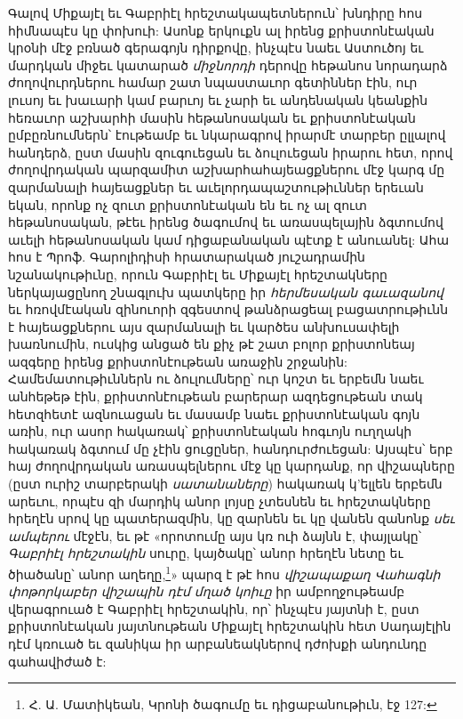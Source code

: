 \documentclass{article}
\begin{document}
{Գալով Միքայէլ եւ Գաբրիէլ հրեշտակապետներուն՝ խնդիրը հոս հիմնապէս կը փոխուի: Ասոնք երկուքն ալ իրենց քրիստոնէական կրօնի մէջ բռնած գերագոյն դիրքովը, ինչպէս նաեւ Աստուծոյ եւ մարդկան միջեւ կատարած \emph{միջնորդի} դերովը հեթանոս նորադարձ ժողովուրդներու համար շատ նպաստաւոր գետիններ էին, ուր լուսոյ եւ խաւարի կամ բարւոյ եւ չարի եւ անդենական կեանքին հեռաւոր աշխարհի մասին հեթանոսական եւ քրիստոնէական ըմբըռնումներն՝ էութեամբ եւ նկարագրով իրարմէ տարբեր ըլլալով հանդերձ, ըստ մասին զուգուեցան եւ ձուլուեցան իրարու հետ, որով ժողովրդական պարզամիտ աշխարհահայեացքներու մէջ կարգ մը զարմանալի հայեացքներ եւ աւելորդապաշտութիւններ երեւան եկան, որոնք ոչ զուտ քրիստոնէական են եւ ոչ ալ զուտ հեթանոսական, թէեւ իրենց ծագումով եւ առասպելային ձգտումով աւելի հեթանոսական կամ դիցաբանական պէտք է անուանել: Ահա հոս է Պրոֆ. Գարոլիդիսի հրատարակած յուշադրամին նշանակութիւնը, որուն Գաբրիէլ եւ Միքայէլ հրեշտակները ներկայացընող շնագլուխ պատկերը իր \emph{հերմեսական գաւազանով} եւ հռովմէական զինուորի զգեստով թանձրացեալ բացատրութիւնն է հայեացքներու այս զարմանալի եւ կարծես անխուսափելի խառնումին, ուսկից անցած են քիչ թէ շատ բոլոր քրիստոնեայ ազգերը իրենց քրիստոնէութեան առաջին շրջանին: Համեմատութիւններն ու ձուլումները՝ ուր կոշտ եւ երբեմն նաեւ անհեթեթ էին, քրիստոնէութեան բարերար ազդեցութեան տակ հետզհետէ ազնուացան եւ մասամբ նաեւ քրիստոնէական գոյն առին, ուր ասոր հակառակ՝ քրիստոնէական հոգւոյն ուղղակի հակառակ ձգտում մը չէին ցուցըներ, հանդուրժուեցան: Այսպէս՝ երբ հայ ժողովրդական առասպելներու մէջ կը կարդանք, որ վիշապները (ըստ ուրիշ տարբերակի \emph{սատանաները}) հակառակ կ'ելլեն երբեմն արեւու, որպէս զի մարդիկ անոր լոյսը չտեսնեն եւ հրեշտակները հրեղէն սրով կը պատերազմին, կը զարնեն եւ կը վանեն զանոնք \emph{սեւ ամպերու} մէջէն, եւ թէ «որոտումը այս կռ ուի ձայնն է, փայլակը՝ \emph{Գաբրիէլ հրեշտակին} սուրը, կայծակը՝ անոր հրեղէն նետը եւ ծիածանը՝ անոր աղեղը,\footnote{Հ. Ա. Մատիկեան, Կրոնի ծագումը եւ դիցաբանութիւն, էջ 127:}» պարզ է թէ հոս \emph{վիշապաքաղ Վահագնի փոթորկաբեր վիշապին դէմ մղած կոիւը} իր ամբողջութեամբ վերագրուած է Գաբրիէլ հրեշտակին, որ՝ ինչպէս յայտնի է, ըստ քրիստոնէական յայտնութեան Միքայէլ հրեշտակին հետ Սադայէլին դէմ կռուած եւ զանիկա իր արբանեակներով դժոխքի անդունդը գահավիժած է:

}
\end{document}
